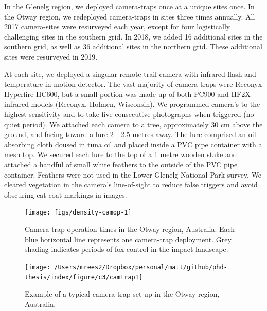 \documentclass[]{elsarticle} %
\begin{document}
In the Glenelg region, we deployed camera-traps once at a unique sites once. In the Otway region, we redeployed camera-traps in sites three times annually. All 2017 camera-sites were resurveyed each year, except for four logistically challenging sites in the southern grid. In 2018, we added 16 additional sites in the southern grid, as well as 36 additional sites in the northern grid. These additional sites were resurveyed in 2019.

At each site, we deployed a singular remote trail camera with infrared flash and temperature-in-motion detector. The vast majority of camera-traps were Reconyx Hyperfire HC600, but a small portion was made up of both PC900 and HF2X infrared models (Reconyx, Holmen, Wisconsin). We programmed camera's to the highest sensitivity and to take five consecutive photographs when triggered (no quiet period). We attached each camera to a tree, approximately 30 cm above the ground, and facing toward a lure 2 - 2.5 metres away. The lure comprised an oil-absorbing cloth doused in tuna oil and placed inside a PVC pipe container with a mesh top. We secured each lure to the top of a 1 metre wooden stake and attached a handful of small white feathers to the outside of the PVC pipe container. Feathers were not used in the Lower Glenelg National Park survey. We cleared vegetation in the camera's line-of-sight to reduce false triggers and avoid obscuring cat coat markings in images.

\newpage

\begin{figure}

{\centering \texttt{[image: figs/density-camop-1]} 

}

\caption{Camera-trap operation times in the Otway region, Australia. Each blue horizontal line represents one camera-trap deployment. Grey shading indicates periods of fox control in the impact landscape.}\label{fig:density-camop}
\end{figure}

\newpage

\begin{figure}

{\centering \texttt{[image: /Users/mrees2/Dropbox/personal/matt/github/phd-thesis/index/figure/c3/camtrap1]} 

}

\caption{Example of a typical camera-trap set-up in the Otway region, Australia.}\label{fig:density-cam-photo}
\end{figure}
\end{document}
